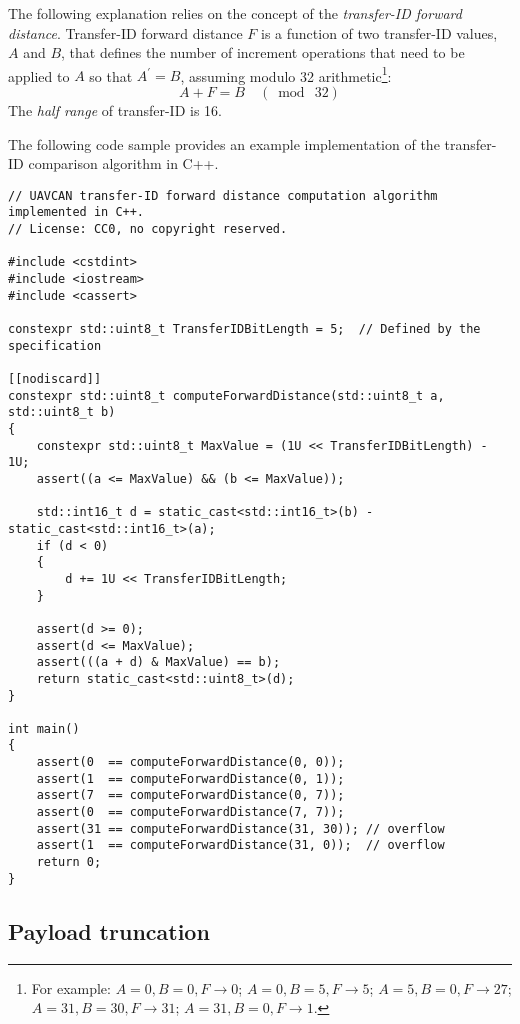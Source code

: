 The following explanation relies on the concept of the \emph{transfer-ID forward distance}.
Transfer-ID forward distance $F$ is a function of two transfer-ID values,
$A$ and $B$, that defines the number of increment operations that need to be applied to
$A$ so that $A^\prime{} = B$, assuming modulo 32 arithmetic\footnote{%
    For example:
    $A=0, B=0, F\rightarrow0$;
    $A=0, B=5, F\rightarrow5$;
    $A=5, B=0, F\rightarrow27$;
    $A=31, B=30, F\rightarrow31$;
    $A=31, B=0, F\rightarrow1$.
}:
$$A + F = B \quad (\bmod{}\ 32)$$
The \emph{half range} of transfer-ID is 16.

The following code sample provides an example implementation of the transfer-ID comparison algorithm in C++.

\begin{minipage}{0.9\textwidth}  %
\begin{verbatim}
// UAVCAN transfer-ID forward distance computation algorithm implemented in C++.
// License: CC0, no copyright reserved.

#include <cstdint>
#include <iostream>
#include <cassert>

constexpr std::uint8_t TransferIDBitLength = 5;  // Defined by the specification

[[nodiscard]]
constexpr std::uint8_t computeForwardDistance(std::uint8_t a, std::uint8_t b)
{
    constexpr std::uint8_t MaxValue = (1U << TransferIDBitLength) - 1U;
    assert((a <= MaxValue) && (b <= MaxValue));

    std::int16_t d = static_cast<std::int16_t>(b) - static_cast<std::int16_t>(a);
    if (d < 0)
    {
        d += 1U << TransferIDBitLength;
    }

    assert(d >= 0);
    assert(d <= MaxValue);
    assert(((a + d) & MaxValue) == b);
    return static_cast<std::uint8_t>(d);
}

int main()
{
    assert(0  == computeForwardDistance(0, 0));
    assert(1  == computeForwardDistance(0, 1));
    assert(7  == computeForwardDistance(0, 7));
    assert(0  == computeForwardDistance(7, 7));
    assert(31 == computeForwardDistance(31, 30)); // overflow
    assert(1  == computeForwardDistance(31, 0));  // overflow
    return 0;
}
\end{verbatim}
\end{minipage}

\subsection{Payload truncation}

